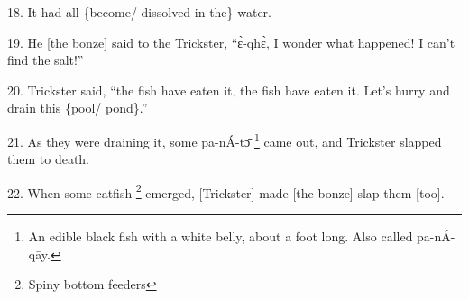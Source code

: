 18. It had all \{become/ dissolved in the\} water.

19. He [the bonze] said to the Trickster, ``ɛ̀-qhɛ̀, I wonder what happened!
I can't find the salt!''

20. Trickster said, ``the fish have eaten it, the fish have eaten it. Let's hurry
and drain this \{pool/ pond\}.''

21. As they were draining it, some pa-nÁ-tɔ̄ \footnote{An edible black fish with a white belly, about a foot long. Also called pa-nÁ-qāy.} came out, and Trickster slapped
them to death.

22. When some catfish \footnote{Spiny bottom feeders} emerged, [Trickster] made [the bonze] slap them [too].
